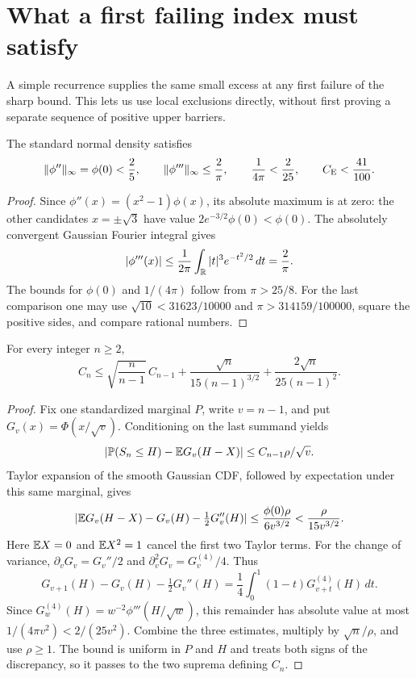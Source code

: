 \section{What a first failing index must satisfy}
\label{j:smoothing:section}

A simple recurrence supplies the
same small excess at any first failure of the sharp bound. This lets us
use local exclusions directly, without first proving a separate sequence
of positive upper barriers.

\begin{lemma}\label{j:smoothing:gaussian}
The standard normal density satisfies
\[
 \|\phi''\|_\infty=\phi(0)<\frac25,
 \qquad \|\phi'''\|_\infty\le\frac2\pi,
 \qquad \frac1{4\pi}<\frac2{25},\qquad C_{\mathrm E}<\frac{41}{100}.
\]
\end{lemma}
\begin{proof}
Since $\phi''(x)=(x^2-1)\phi(x)$, its absolute maximum is at zero:
the other candidates $x=\pm\sqrt3$ have value
$2e^{-3/2}\phi(0)<\phi(0)$. The absolutely convergent Gaussian
Fourier integral gives
\[
 |\phi'''(x)|\le\frac1{2\pi}
       \int_{\mathbb R}|t|^3e^{-t^2/2}\,dt=\frac2\pi.
\]
The bounds for $\phi(0)$ and $1/(4\pi)$ follow from $\pi>25/8$.
For the last comparison one may use
$\sqrt{10}<31623/10000$ and $\pi>314159/100000$, square the
positive sides, and compare rational numbers.
\end{proof}

\begin{theorem}\label{j:smoothing:recurrence}
For every integer $n\ge2$,
\begin{equation}\label{j:smoothing:section-recurrence}
 C_n\le\sqrt{\frac n{n-1}}\,C_{n-1}
       +\frac{\sqrt n}{15(n-1)^{3/2}}
       +\frac{2\sqrt n}{25(n-1)^2}.
\end{equation}
\end{theorem}
\begin{proof}
Fix one standardized marginal $P$, write $v=n-1$, and put
$G_v(x)=\Phi(x/\sqrt v)$. Conditioning on the last summand yields
\[
 |\mathbb P(S_n\le H)-\mathbb E G_v(H-X)|\le C_{n-1}\rho/\sqrt v.
\]
Taylor expansion of the smooth Gaussian CDF, followed by expectation
under this same marginal, gives
\[
 |\mathbb E G_v(H-X)-G_v(H)-\tfrac12G_v''(H)|
 \le\frac{\phi(0)\rho}{6v^{3/2}}<\frac\rho{15v^{3/2}}.
\]
Here $\mathbb E X=0$ and $\mathbb E X^2=1$ cancel the first two Taylor terms.
For the change of variance, $\partial_vG_v=G_v''/2$ and
$\partial_v^2G_v=G_v^{(4)}/4$. Thus
\[
 G_{v+1}(H)-G_v(H)-\tfrac12G_v''(H)
 =\frac14\int_0^1(1-t)G_{v+t}^{(4)}(H)\,dt.
\]
Since $G_w^{(4)}(H)=w^{-2}\phi'''(H/\sqrt w)$, this remainder
has absolute value at most $1/(4\pi v^2)<2/(25v^2)$.
Combine the three estimates, multiply by $\sqrt n/\rho$, and use
$\rho\ge1$. The bound is uniform in $P$ and $H$ and treats both
signs of the discrepancy, so it passes to the two suprema defining $C_n$.
\end{proof}

